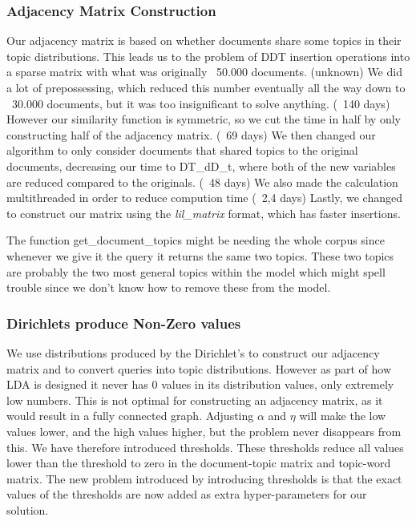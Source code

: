\subsubsection{Adjacency Matrix Construction}
Our adjacency matrix is based on whether documents share some topics in their topic distributions. 
This leads us to the problem of D\*D\*T insertion operations into a sparse matrix with what was originally ~50.000 documents. (unknown)
We did a lot of prepossessing, which reduced this number eventually all the way down to ~30.000 documents, but it was too insignificant to solve anything. (~140 days)
However our similarity function is symmetric, so we cut the time in half by only constructing half of the adjacency matrix. (~69 days)
We then changed our algorithm to only consider documents that shared topics to the original documents, decreasing our time to D\*T\_d\*D\_t, where both of the new variables are reduced compared to the originals. (~48 days)
We also made the calculation multithreaded in order to reduce compution time (~2,4 days)
Lastly, we changed to construct our matrix using the \emph{lil\_matrix} format, which has faster insertions.


The function get\_document\_topics might be needing the whole corpus since whenever we give it the query it returns the same two topics. 
These two topics are probably the two most general topics within the model which might spell trouble since we don't know how to remove these from the model.

\subsubsection{Dirichlets produce Non-Zero values}
We use distributions produced by the Dirichlet's to construct our adjacency matrix and to convert queries into topic distributions. 
However as part of how LDA is designed it never has 0 values in its distribution values, only extremely low numbers.
This is not optimal for constructing an adjacency matrix, as it would result in a fully connected graph.
Adjusting $\alpha$ and $\eta$ will make the low values lower, and the high values higher, but the problem never disappears from this.
We have therefore introduced thresholds. 
These thresholds reduce all values lower than the threshold to zero in the document-topic matrix and topic-word matrix.
The new problem introduced by introducing thresholds is that the exact values of the thresholds are now added as extra hyper-parameters for our solution.
